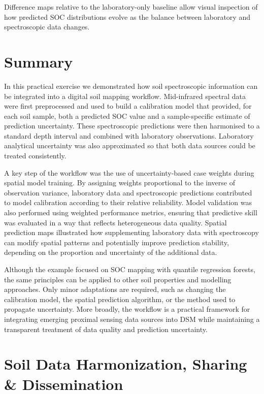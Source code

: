 \documentclass[
  10pt,
  b5paper,
  oneside]{book}
\begin{document}
Difference maps relative to the laboratory-only baseline allow visual inspection of how predicted SOC distributions evolve as the balance between laboratory and spectroscopic data changes.

\chapter{Summary}\label{summary}

In this practical exercise we demonstrated how soil spectroscopic information can be integrated into a digital soil mapping workflow. Mid-infrared spectral data were first preprocessed and used to build a calibration model that provided, for each soil sample, both a predicted SOC value and a sample-specific estimate of prediction uncertainty. These spectroscopic predictions were then harmonised to a standard depth interval and combined with laboratory observations. Laboratory analytical uncertainty was also approximated so that both data sources could be treated consistently.

A key step of the workflow was the use of uncertainty-based case weights during spatial model training. By assigning weights proportional to the inverse of observation variance, laboratory data and spectroscopic predictions contributed to model calibration according to their relative reliability. Model validation was also performed using weighted performance metrics, ensuring that predictive skill was evaluated in a way that reflects heterogeneous data quality. Spatial prediction maps illustrated how supplementing laboratory data with spectroscopy can modify spatial patterns and potentially improve prediction stability, depending on the proportion and uncertainty of the additional data.

Although the example focused on SOC mapping with quantile regression forests, the same principles can be applied to other soil properties and modelling approaches. Only minor adaptations are required, such as changing the calibration model, the spatial prediction algorithm, or the method used to propagate uncertainty. More broadly, the workflow is a practical framework for integrating emerging proximal sensing data sources into DSM while maintaining a transparent treatment of data quality and prediction uncertainty.

\chapter{Soil Data Harmonization, Sharing \& Dissemination}\label{soil-data-harmonization-sharing-dissemination}
\end{document}
